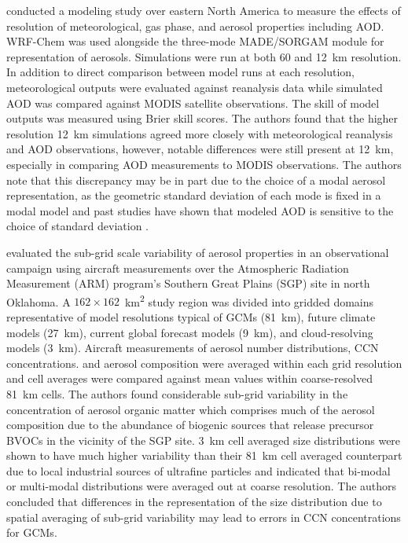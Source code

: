 \textcite{crippa_impact_2017} conducted a modeling study over eastern North America to measure the effects of resolution of meteorological, gas phase, and aerosol properties including AOD. WRF-Chem was used alongside the three-mode MADE/SORGAM module for representation of aerosols. Simulations were run at both 60 and 12~km resolution. In addition to direct comparison between model runs at each resolution, meteorological outputs were evaluated against reanalysis data while simulated AOD was compared against MODIS satellite observations. The skill of model outputs was measured using Brier skill scores. The authors found that the higher resolution 12~km simulations agreed more closely with meteorological reanalysis and AOD observations, however, notable differences were still present at 12~km, especially in comparing AOD measurements to MODIS observations. The authors note that this discrepancy may be in part due to the choice of a modal aerosol representation, as the geometric standard deviation of each mode is fixed in a modal model and past studies have shown that modeled AOD is sensitive to the choice of standard deviation \parencite{brock_aerosol_2016, mann_intercomparison_2012}. 

\textcite{fast_using_2022} evaluated the sub-grid scale variability of aerosol properties in an observational campaign using aircraft measurements over the Atmospheric Radiation Measurement (ARM) program's Southern Great Plains (SGP) site in north Oklahoma. A $162\times162$~\si{km^2} study region was divided into gridded domains representative of model resolutions typical of GCMs (81~km), future climate models (27~km), current global forecast models (9~km), and cloud-resolving models (3~km). Aircraft measurements of aerosol number distributions, CCN concentrations. and aerosol composition were averaged within each grid resolution and cell averages were compared against mean values within coarse-resolved 81~km cells. The authors found considerable sub-grid variability in the concentration of aerosol organic matter which comprises much of the aerosol composition due to the abundance of biogenic sources that release precursor BVOCs in the vicinity of the SGP site. 3~km cell averaged size distributions were shown to have much higher variability than their 81~km cell averaged counterpart due to local industrial sources of ultrafine particles and indicated that bi-modal or multi-modal distributions were averaged out at coarse resolution. The authors concluded that differences in the representation of the size distribution due to spatial averaging of sub-grid variability may lead to errors in CCN concentrations for GCMs. 

